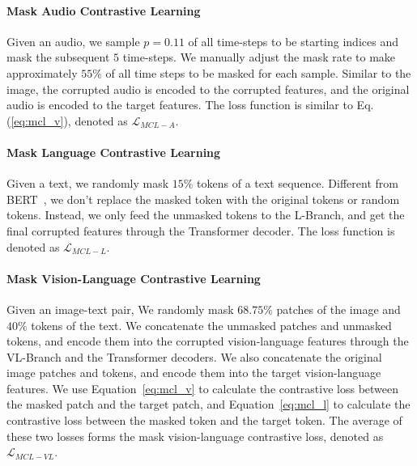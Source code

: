 \paragraph{Mask Audio Contrastive Learning}
Given an audio, we sample $p=0.11$ of all time-steps to be starting indices and mask the subsequent $5$ time-steps. We manually adjust the mask rate to make approximately $55\%$ of all time steps to be masked for each sample. 
Similar to the image, the corrupted audio is encoded to the corrupted features, and the original audio is encoded to the target features.
The loss function is similar to Eq. (\ref{eq:mcl_v}), denoted as $\mathcal{L}_{MCL-A}$.


\paragraph{Mask Language Contrastive Learning}
Given a text, we randomly mask $15\%$ tokens of a text sequence. 
Different from BERT~\cite{bert}, we don't replace the masked token with the original tokens or random tokens. Instead, we only feed the unmasked tokens to the L-Branch, and get the final corrupted features through the Transformer decoder. 
The loss function is denoted as $\mathcal{L}_{MCL-L}$.


\paragraph{Mask Vision-Language Contrastive Learning}
Given an image-text pair, We randomly mask $68.75\%$ patches of the image and $40\%$ tokens of the text. 
We concatenate the unmasked patches and unmasked tokens, and encode them into the corrupted vision-language features through the VL-Branch and the Transformer decoders.
We also concatenate the original image patches and tokens, and encode them into the target vision-language features.
We use Equation~\ref{eq:mcl_v} to calculate the contrastive loss between the masked patch and the target patch, and Equation~\ref{eq:mcl_l} to calculate the contrastive loss between the masked token and the target token.
The average of these two losses forms the mask vision-language contrastive loss, denoted as $\mathcal{L}_{MCL-VL}$.

